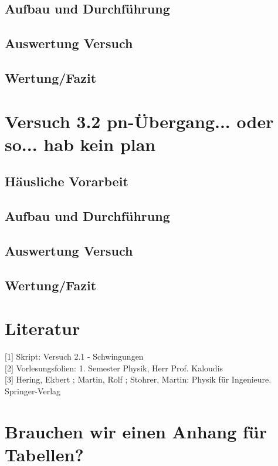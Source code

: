 \documentclass[a4paper]{scrartcl}
\numberwithin{equation}{subsection}
\begin{document}
\newpage

\subsection{Aufbau und Durchführung}

\newpage

\subsection{Auswertung Versuch}

\newpage

\subsection{Wertung/Fazit}

\newpage


\section{Versuch 3.2 pn-Übergang... oder so... hab kein plan}
\subsection{Häusliche Vorarbeit}

\newpage

\subsection{Aufbau und Durchführung}

\newpage

\subsection{Auswertung Versuch}

\newpage

\subsection{Wertung/Fazit}

\newpage

\section{Literatur}
$[$1$]$ Skript: Versuch 2.1 - Schwingungen \\
$[$2$]$ Vorlesungsfolien: 1. Semester Physik, Herr Prof. Kaloudis \\
$[$3$]$ Hering, Ekbert ; Martin, Rolf ; Stohrer, Martin: Physik für Ingenieure. Springer-Verlag

\section{Brauchen wir einen Anhang für Tabellen?}

\label{LastPage}
\end{document}
